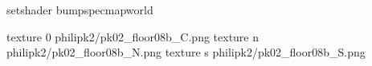 setshader bumpspecmapworld

texture 0 philipk2/pk02_floor08b_C.png
texture n philipk2/pk02_floor08b_N.png
texture s philipk2/pk02_floor08b_S.png


